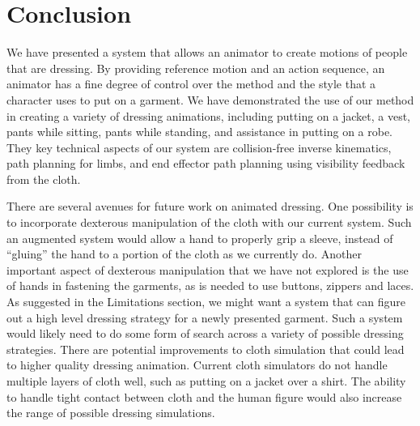 \section{Conclusion}

We have presented a system that allows an animator to create motions
of people that are dressing.  By providing reference motion and an
action sequence, an animator has a fine degree of control over the
method and the style that a character uses to put on a garment.  We
have demonstrated the use of our method in creating a variety of
dressing animations, including putting on a jacket, a vest, pants
while sitting, pants while standing, and assistance in putting on a
robe.  They key technical aspects of our system are collision-free
inverse kinematics, path planning for limbs, and end effector path
planning using visibility feedback from the cloth.

There are several avenues for future work on animated dressing.  One
possibility is to incorporate dexterous manipulation of the cloth with our
current system.  Such an augmented system would allow a hand to properly
grip a sleeve, instead of ``gluing'' the hand to a portion of the cloth as
we currently do.  Another important aspect of dexterous manipulation that
we have not explored is the use of hands in fastening the garments, as is
needed to use buttons, zippers and laces.  As suggested in the Limitations
section, we might want a system that can figure out a high level dressing
strategy for a newly presented garment.  Such a system would likely need
to do some form of search across a variety of possible dressing
strategies.  There are potential improvements to cloth simulation that
could lead to higher quality dressing animation.  Current cloth simulators
do not handle multiple layers of cloth well, such as putting on a jacket
over a shirt.  The ability to handle tight contact between cloth and
the human figure would also increase the range of possible dressing
simulations.

